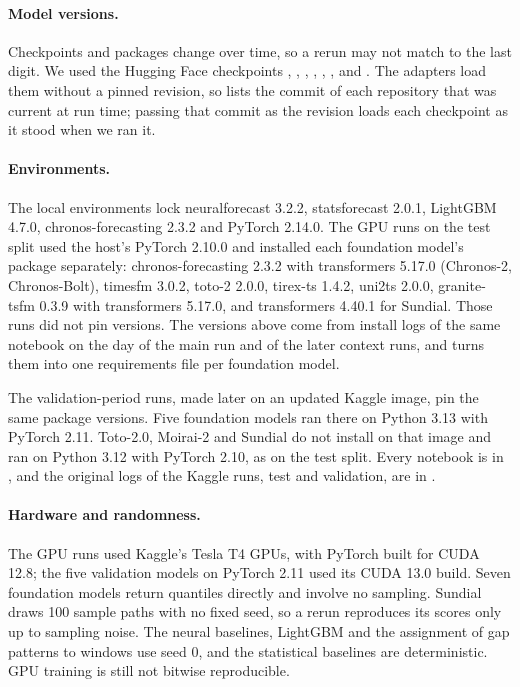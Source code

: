 \paragraph{Model versions.} Checkpoints and packages change over time, so a rerun may not match to the last
digit. We used the Hugging Face checkpoints , ,
, , ,
,  and
. The adapters load them without a pinned revision, so 
lists the commit of each repository that was current at run time; passing that commit as the revision
loads each checkpoint as it stood when we ran it.

\paragraph{Environments.} The local environments lock neuralforecast 3.2.2, statsforecast 2.0.1, LightGBM 4.7.0,
chronos-forecasting 2.3.2 and PyTorch 2.14.0. The GPU runs on the test split used the host's PyTorch 2.10.0 and
installed each foundation model's package separately: chronos-forecasting 2.3.2 with transformers 5.17.0
(Chronos-2, Chronos-Bolt), timesfm 3.0.2, toto-2 2.0.0, tirex-ts 1.4.2, uni2ts 2.0.0, granite-tsfm 0.3.9 with
transformers 5.17.0, and transformers 4.40.1 for Sundial. Those runs did not pin versions. The versions above come
from install logs of the same notebook on the day of the main run and of the later context runs, and
 turns them into one requirements file per foundation model.

The validation-period runs, made later on an updated Kaggle image, pin the same package versions. Five foundation
models ran there on Python 3.13 with PyTorch 2.11. Toto-2.0, Moirai-2 and Sundial do not install on that image
and ran on Python 3.12 with PyTorch 2.10, as on the test split. Every notebook is in , and the
original logs of the Kaggle runs, test and validation, are in .

\paragraph{Hardware and randomness.} The GPU runs used Kaggle's Tesla T4 GPUs, with PyTorch built for
CUDA 12.8; the five validation models on PyTorch 2.11 used its CUDA 13.0 build. Seven foundation models return
quantiles directly and involve no sampling. Sundial draws 100 sample paths with no fixed seed, so a rerun
reproduces its scores only up to sampling noise. The neural baselines, LightGBM and the assignment of gap patterns
to windows use seed 0, and the statistical baselines are deterministic. GPU training is still not bitwise
reproducible.

